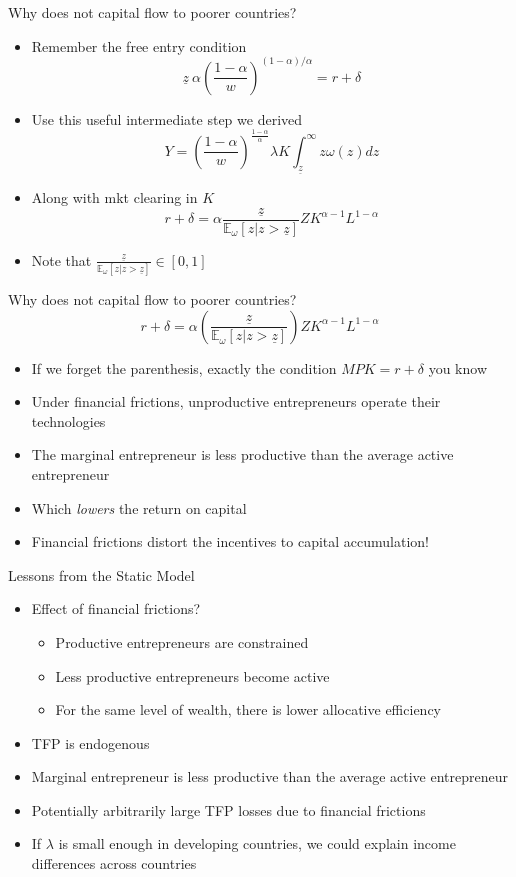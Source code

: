 \documentclass[11pt,aspectratio=169,xcolor={dvipsnames},hyperref={pdftex,pdfpagemode=UseNone,hidelinks,pdfdisplaydoctitle=true},usepdftitle=false]{beamer}
\begin{document}
\begin{frame}{Why does not capital flow to poorer countries?}
\begin{itemize}
\item Remember the free entry condition
\[\underline{z}\  \alpha\left(\frac{1-\alpha}{w}\right)^{(1-\alpha)/\alpha} = r + \delta\]
\item Use this useful intermediate step we derived
\[Y = \left(\frac{1-\alpha}{w}\right)^{\frac{1-\alpha}{\alpha}} \lambda K \int_{\underline{z}}^{\infty} z \omega(z) dz \]
\item Along with mkt clearing in $K$
\[r + \delta = \alpha \frac{\underline{z}}{\mathbb{E}_{\omega} \left[z| z> \underline{z} \right]} Z K^{\alpha-1}L^{1-\alpha} \]
\item Note that $\frac{\underline{z}}{\mathbb{E}_{\omega} \left[z| z> \underline{z} \right]} \in [0,1]$
\end{itemize}
\end{frame}


\begin{frame}{Why does not capital flow to poorer countries?}
\[r + \delta =\alpha \left ( \frac{\underline{z}}{\mathbb{E}_{\omega} \left[z| z> \underline{z} \right]} \right) Z K^{\alpha-1}L^{1-\alpha}\]
\begin{itemize}
\item If we forget the parenthesis, exactly the condition $MPK = r + \delta$ you know
\item Under financial frictions, unproductive entrepreneurs operate their technologies
\item The marginal entrepreneur is less productive than the average active entrepreneur
\item Which \textit{lowers} the return on capital
\item Financial frictions distort the incentives to capital accumulation!
\end{itemize}
\end{frame}

\begin{frame}{Lessons from the Static Model}
\begin{itemize}
\item Effect of financial frictions?
\begin{itemize}
\item Productive entrepreneurs are constrained
\item Less productive entrepreneurs become active
\item For the same level of wealth, there is lower allocative efficiency
\end{itemize}
\item TFP is endogenous
\item Marginal entrepreneur is less productive than the average active entrepreneur
\item Potentially arbitrarily large TFP losses due to financial frictions
\item If $\lambda$ is small enough in developing countries, we could explain income differences across countries
\end{itemize}
\end{frame}
\end{document}
